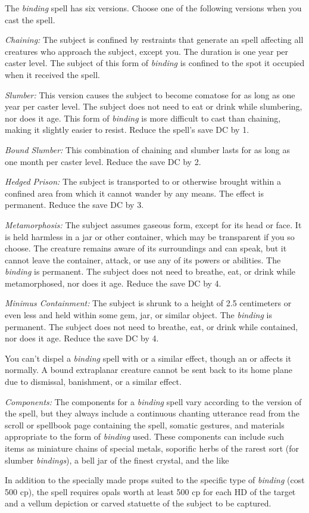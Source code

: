 {	The \emph{binding} spell has six versions. Choose one of the following versions when you cast the spell.

	\textit{Chaining:}
	The subject is confined by restraints that generate an  spell affecting all creatures who approach the subject, except you. The duration is one year per caster level. The subject of this form of \emph{binding} is confined to the spot it occupied when it received the spell.

	\textit{Slumber:}
	This version causes the subject to become comatose for as long as one year per caster level. The subject does not need to eat or drink while slumbering, nor does it age. This form of \emph{binding} is more difficult to cast than chaining, making it slightly easier to resist. Reduce the spell's save DC by 1.

	\textit{Bound Slumber:}
	This combination of chaining and slumber lasts for as long as one month per caster level. Reduce the save DC by 2.

	\textit{Hedged Prison:}
	The subject is transported to or otherwise brought within a confined area from which it cannot wander by any means. The effect is permanent. Reduce the save DC by 3.

	\textit{Metamorphosis:}
	The subject assumes gaseous form, except for its head or face. It is held harmless in a jar or other container, which may be transparent if you so choose. The creature remains aware of its surroundings and can speak, but it cannot leave the container, attack, or use any of its powers or abilities. The \emph{binding} is permanent. The subject does not need to breathe, eat, or drink while metamorphosed, nor does it age. Reduce the save DC by 4.

	\textit{Minimus Containment:}
	The subject is shrunk to a height of 2.5 centimeters or even less and held within some gem, jar, or similar object. The \emph{binding} is permanent. The subject does not need to breathe, eat, or drink while contained, nor does it age. Reduce the save DC by 4.

	You can't dispel a \emph{binding} spell with  or a similar effect, though an  or  affects it normally. A bound extraplanar creature cannot be sent back to its home plane due to dismissal, banishment, or a similar effect.

	\textit{Components:}
	The components for a \emph{binding} spell vary according to the version of the spell, but they always include a continuous chanting utterance read from the scroll or spellbook page containing the spell, somatic gestures, and materials appropriate to the form of \emph{binding} used. These components can include such items as miniature chains of special metals, soporific herbs of the rarest sort (for slumber \emph{bindings}), a bell jar of the finest crystal, and the like

	In addition to the specially made props suited to the specific type of \emph{binding} (cost 500 cp), the spell requires opals worth at least 500 cp for each HD of the target and a vellum depiction or carved statuette of the subject to be captured.

}

